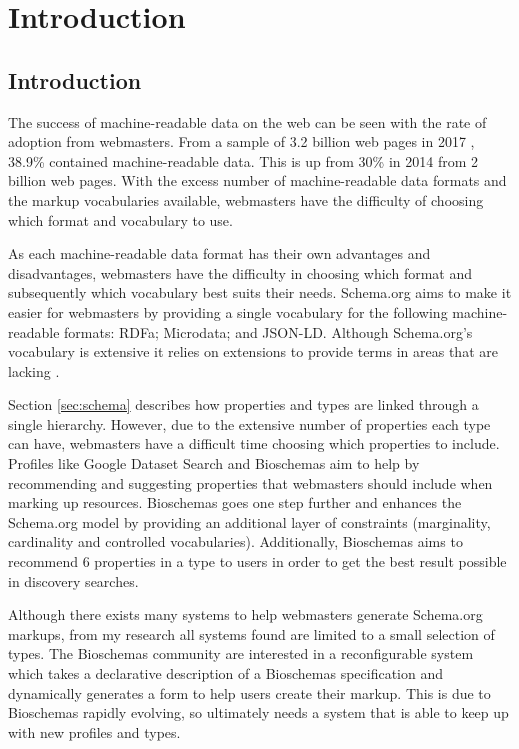 
\chapter{Introduction}\label{ch:introduction}

\section{Introduction}
The success of machine-readable data on the web can be seen with the rate of adoption from webmasters. From a sample of 3.2 billion web pages in 2017 \cite{webDataCommons2017}, 38.9\% contained machine-readable data. This is up from 30\% in 2014 \cite{webDataCommons2014} from 2 billion web pages. With the excess number of machine-readable data formats and the markup vocabularies available, webmasters have the difficulty of choosing which format and vocabulary to use. 

As each machine-readable data format has their own advantages and disadvantages, webmasters have the difficulty in choosing which format and subsequently which vocabulary best suits their needs. Schema.org aims to make it easier for webmasters by providing a single vocabulary \cite{schemaOrg} for the following machine-readable formats: RDFa; Microdata; and JSON-LD. Although Schema.org's vocabulary is extensive it relies on extensions to provide terms in areas that are lacking \cite{schemaExtensions}. 

Section \ref{sec:schema} describes how properties and types are linked through a single hierarchy. However, due to the extensive number of properties each type can have, webmasters have a difficult time choosing which properties to include. Profiles like Google Dataset Search and Bioschemas aim to help by recommending and suggesting properties that webmasters should include when marking up resources. Bioschemas goes one step further and enhances the Schema.org model by providing an additional layer of constraints (marginality, cardinality and controlled vocabularies)\cite{gray2017bioschemas}. Additionally, Bioschemas aims to recommend 6 properties in a type to users in order to get the best result possible in discovery searches.

\newpage
Although there exists many systems to help webmasters generate Schema.org markups, from my research all systems found are limited to a small selection of types. The Bioschemas community are interested in a reconfigurable system which takes a declarative description of a Bioschemas specification and dynamically generates a form to help users create their markup. This is due to Bioschemas rapidly evolving, so ultimately needs a system that is able to keep up with new profiles and types.

